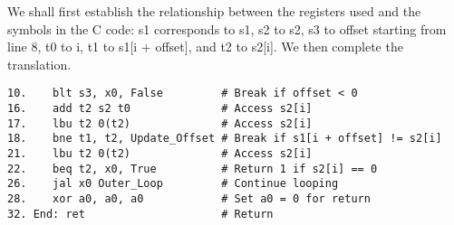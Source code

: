 \begin{blocksection}
\begin{solution}

We shall first establish the relationship between the registers used and the symbols in the C code: s1 corresponds to s1, s2 to s2, s3 to offset starting from line 8, t0 to i, t1 to s1[i + offset], and t2 to s2[i]. We then complete the translation.

\begin{verbatim}
10.    blt s3, x0, False         # Break if offset < 0
16.    add t2 s2 t0              # Access s2[i]
17.    lbu t2 0(t2)              # Access s2[i]
18.    bne t1, t2, Update_Offset # Break if s1[i + offset] != s2[i]
21.    lbu t2 0(t2)              # Access s2[i]
22.    beq t2, x0, True          # Return 1 if s2[i] == 0
26.    jal x0 Outer_Loop         # Continue looping
28.    xor a0, a0, a0            # Set a0 = 0 for return
32. End: ret                     # Return
\end{verbatim}
\end{solution}



\end{blocksection}